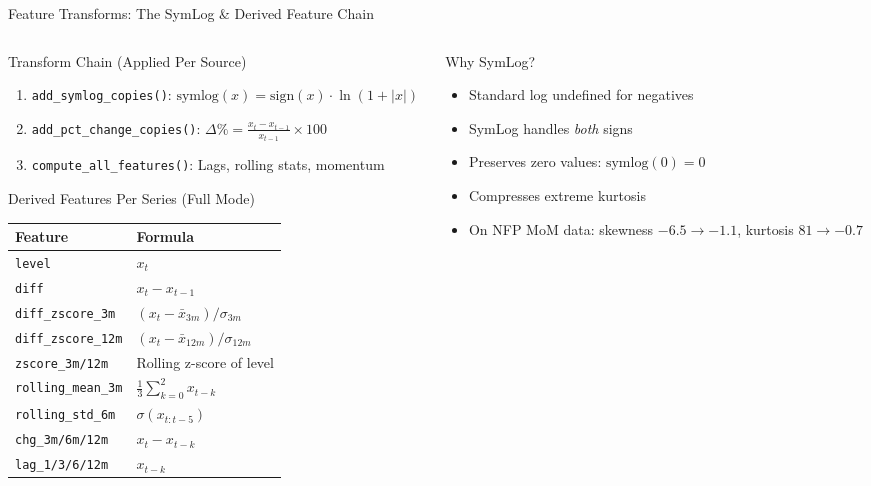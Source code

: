 \documentclass[aspectratio=169,10pt]{beamer}
\begin{document}
\begin{frame}{Feature Transforms: The SymLog \& Derived Feature Chain}
\begin{columns}[T]
\begin{column}{0.55\textwidth}
\begin{block}{Transform Chain (Applied Per Source)}
\footnotesize
\begin{enumerate}
  \item \texttt{add\_symlog\_copies()}: $\text{symlog}(x) = \text{sign}(x) \cdot \ln(1 + |x|)$
  \item \texttt{add\_pct\_change\_copies()}: $\Delta\% = \frac{x_t - x_{t-1}}{x_{t-1}} \times 100$
  \item \texttt{compute\_all\_features()}: Lags, rolling stats, momentum
\end{enumerate}
\end{block}

\begin{block}{Derived Features Per Series (Full Mode)}
\scriptsize
\begin{tabular}{@{}ll@{}}
\toprule
\textbf{Feature} & \textbf{Formula} \\
\midrule
\texttt{level} & $x_t$ \\
\texttt{diff} & $x_t - x_{t-1}$ \\
\texttt{diff\_zscore\_3m} & $(x_t - \bar{x}_{3m}) / \sigma_{3m}$ \\
\texttt{diff\_zscore\_12m} & $(x_t - \bar{x}_{12m}) / \sigma_{12m}$ \\
\texttt{zscore\_3m/12m} & Rolling z-score of level \\
\texttt{rolling\_mean\_3m} & $\frac{1}{3}\sum_{k=0}^{2} x_{t-k}$ \\
\texttt{rolling\_std\_6m} & $\sigma(x_{t:t-5})$ \\
\texttt{chg\_3m/6m/12m} & $x_t - x_{t-k}$ \\
\texttt{lag\_1/3/6/12m} & $x_{t-k}$ \\
\bottomrule
\end{tabular}
\end{block}
\end{column}
\begin{column}{0.42\textwidth}
\begin{exampleblock}{Why SymLog?}
\footnotesize
\begin{itemize}
  \item Standard log undefined for negatives
  \item SymLog handles \emph{both} signs
  \item Preserves zero values: $\text{symlog}(0) = 0$
  \item Compresses extreme kurtosis
  \item On NFP MoM data: skewness $-6.5 \to -1.1$, kurtosis $81 \to -0.7$
\end{itemize}
\end{exampleblock}


\end{column}
\end{columns}
\end{frame}
\end{document}
